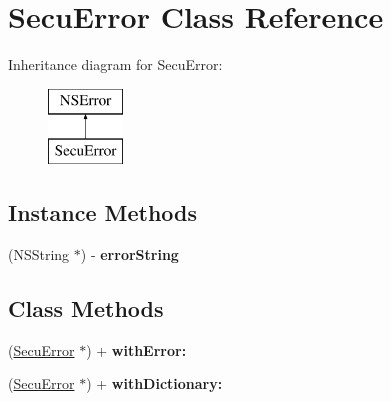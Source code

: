 \hypertarget{interface_secu_error}{}\section{Secu\+Error Class Reference}
\label{interface_secu_error}
Inheritance diagram for Secu\+Error\+:\begin{figure}[H]
\begin{center}
\leavevmode
\includegraphics[height=2.000000cm]{interface_secu_error}
\end{center}
\end{figure}
\subsection*{Instance Methods}
\begin{DoxyCompactItemize}
\item 
(N\+S\+String $\ast$) -\/ {\bfseries error\+String}\hypertarget{interface_secu_error_a7eee971f97be1dc2179a475c292fdc66}{}\label{interface_secu_error_a7eee971f97be1dc2179a475c292fdc66}

\end{DoxyCompactItemize}
\subsection*{Class Methods}
\begin{DoxyCompactItemize}
\item 
(\hyperlink{interface_secu_error}{Secu\+Error} $\ast$) + {\bfseries with\+Error\+:}\hypertarget{interface_secu_error_abfa3d83eed5deb1a6de157969b228d5c}{}\label{interface_secu_error_abfa3d83eed5deb1a6de157969b228d5c}

\item 
(\hyperlink{interface_secu_error}{Secu\+Error} $\ast$) + {\bfseries with\+Dictionary\+:}\hypertarget{interface_secu_error_aa82371cf2d5400d816a933597cb3c3e5}{}\label{interface_secu_error_aa82371cf2d5400d816a933597cb3c3e5}

\end{DoxyCompactItemize}
